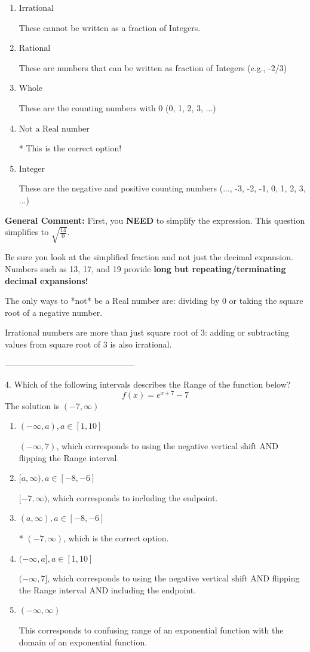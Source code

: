 \documentclass{extbook}[14pt]
\begin{document}
\begin{enumerate}[label=\Alph*.] 
\item $ \text{Irrational} $ 

 These cannot be written as a fraction of Integers. 
\item $ \text{Rational} $ 

 These are numbers that can be written as fraction of Integers (e.g., -2/3) 
\item $ \text{Whole} $ 

 These are the counting numbers with 0 (0, 1, 2, 3, ...) 
\item $ \text{Not a Real number} $ 

 * This is the correct option! 
\item $ \text{Integer} $ 

 These are the negative and positive counting numbers (..., -3, -2, -1, 0, 1, 2, 3, ...) 
\end{enumerate} 
 
\textbf{General Comment:} First, you \textbf{NEED} to simplify the expression. This question simplifies to $\sqrt{\frac{14}{0}}$. 
 
 Be sure you look at the simplified fraction and not just the decimal expansion. Numbers such as 13, 17, and 19 provide \textbf{long but repeating/terminating decimal expansions!} 
 
 The only ways to *not* be a Real number are: dividing by 0 or taking the square root of a negative number. 
 
 Irrational numbers are more than just square root of 3: adding or subtracting values from square root of 3 is also irrational. 

-----------------------------------------------

4. Which of the following intervals describes the Range of the function below?
\[ f(x) = e^{x+7}-7 \] 
The solution is $ (-7, \infty) $ 

\begin{enumerate}[label=\Alph*.] 
\item $ (-\infty, a), a \in [1, 10] $ 

 $(-\infty, 7)$, which corresponds to using the negative vertical shift AND flipping the Range interval. 
\item $ [a, \infty), a \in [-8, -6] $ 

 $[-7, \infty)$, which corresponds to including the endpoint. 
\item $ (a, \infty), a \in [-8, -6] $ 

 * $(-7, \infty)$, which is the correct option. 
\item $ (-\infty, a], a \in [1, 10] $ 

 $(-\infty, 7]$, which corresponds to using the negative vertical shift AND flipping the Range interval AND including the endpoint. 
\item $ (-\infty, \infty) $ 

 This corresponds to confusing range of an exponential function with the domain of an exponential function. 
\end{enumerate} 
 
\end{document}
